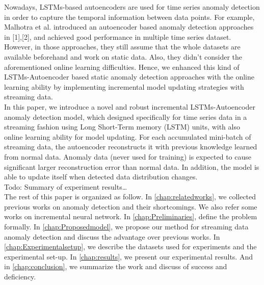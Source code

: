 Nowadays, LSTMs-based autoencoders are used for time series anomaly detection in order to capture the temporal information between data points. For example, Malhotra et al. introduced an autoencoder based anomaly detection approaches in [1],[2], and achieved good performance in multiple time series dataset. However, in those approaches, they still assume that the whole datasets are available beforehand and work on static data. Also, they didn’t consider the aforementioned online learning difficulties. Hence, we enhanced this kind of LSTMs-Autoencoder based static anomaly detection approaches with the online learning ability by implementing incremental model updating strategies with streaming data.\\

In this paper, we introduce a novel and robust incremental LSTMs-Autoencoder anomaly detection model, which designed specifically for time series data in a streaming fashion using Long Short-Term memory (LSTM) units, with also online learning ability for model updating. For each accumulated mini-batch of streaming data, the autoencoder reconstructs it with previous knowledge learned from normal data. Anomaly data (never used for training) is expected to cause significant larger reconstruction error than normal data. In addition, the model is able to update itself when detected data distribution changes.\\

Todo: Summary of experiment results…\\

The rest of this paper is organized as follow. In \autoref{chap:relatedworks}, we collected previous works on anomaly detection and their shortcomings. We also refer some works on incremental neural network. In \autoref{chap:Preliminaries}, define the problem formally. In \autoref{chap:Proposedmodel}, we propose our method for streaming data anomaly detection and discuss the advantage over previous works. In \autoref{chap:Experimentalsetup}, we describe the datasets used for experiments and the experimental set-up. In \autoref{chap:results}, we present our experimental results. And in \autoref{chap:conclusion}, we summarize the work and discuss of success and deficiency.
